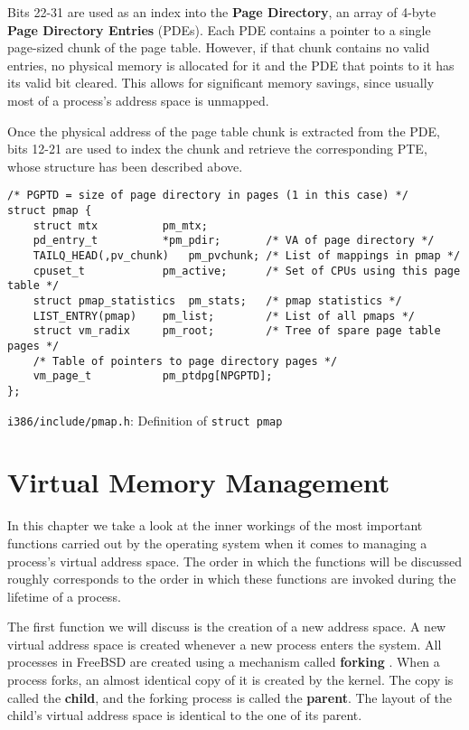 \documentclass[shortabstract, english]{iithesis}
\begin{document}
Bits 22-31 are used as an index into the \textbf{Page Directory}, an array of
4-byte \textbf{Page Directory Entries} (PDEs). Each PDE contains a pointer to a
single page-sized chunk of the page table. However, if that chunk contains no
valid entries, no physical memory is allocated for it and the PDE that points to
it has its valid bit cleared. This allows for significant memory savings, since
usually most of a process's address space is unmapped.

Once the physical address of the page table chunk is extracted from the PDE,
bits 12-21 are used to index the chunk and retrieve the corresponding PTE, whose
structure has been described above.

\begin{listing}[H]
\begin{verbatim}
/* PGPTD = size of page directory in pages (1 in this case) */
struct pmap {
    struct mtx          pm_mtx;
    pd_entry_t          *pm_pdir;       /* VA of page directory */
    TAILQ_HEAD(,pv_chunk)   pm_pvchunk; /* List of mappings in pmap */
    cpuset_t            pm_active;      /* Set of CPUs using this page table */
    struct pmap_statistics  pm_stats;   /* pmap statistics */
    LIST_ENTRY(pmap)    pm_list;        /* List of all pmaps */
    struct vm_radix     pm_root;        /* Tree of spare page table pages */
    /* Table of pointers to page directory pages */
    vm_page_t           pm_ptdpg[NPGPTD];
};
\end{verbatim}
\caption{\texttt{i386/include/pmap.h}: Definition of \texttt{struct pmap}}
\end{listing}


\chapter{Virtual Memory Management}

In this chapter we take a look at the inner workings of the most important
functions carried out by the operating system when it comes to managing a
process's virtual address space. The order in which the functions will be
discussed roughly corresponds to the order in which these functions are invoked
during the lifetime of a process.

The first function we will discuss is the creation of a new address space. A new
virtual address space is created whenever a new process enters the system. All
processes in FreeBSD are created using a mechanism called \textbf{forking}
\cite[Section~1.6.1]{bib:tanenbaum}. When a process forks, an almost identical
copy of it is created by the kernel. The copy is called the \textbf{child}, and
the forking process is called the \textbf{parent}. The layout of the child's
virtual address space is identical to the one of its parent.
\end{document}
